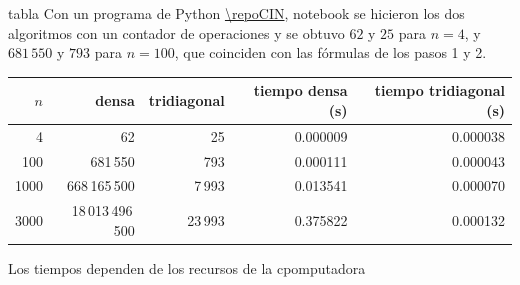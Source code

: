 





tabla
Con un programa de Python \url{\repoCIN}, notebook
se hicieron los dos algoritmos con un contador de operaciones y se obtuvo
$62$ y $25$ para $n = 4$, y $681\,550$ y $793$ para $n = 100$, que coinciden con las fórmulas de los pasos 1 y 2.

\begin{center}
	\begin{tabular}{rrrrr}\toprule
		$n$ & densa & tridiagonal & tiempo densa (s) & tiempo tridiagonal (s)\\\midrule
		4 & 62 & 25 & 0.000009 & 0.000038 \\
		100 & 681\,550 & 793 & 0.000111 & 0.000043 \\
		1000 & 668\,165\,500 & 7\,993 & 0.013541 & 0.000070 \\
		3000 & 18\,013\,496\,500 & 23\,993 & 0.375822 & 0.000132 \\\bottomrule
	\end{tabular}
\end{center}
Los tiempos dependen de los recursos de la cpomputadora
